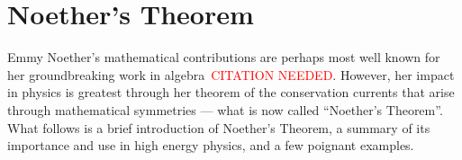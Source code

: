 \chapter{Noether's Theorem}\label{appendix:Noethers_theorem}

Emmy Noether's mathematical contributions are perhaps most well known for her groundbreaking work in algebra~\textcolor{red}{CITATION NEEDED}.
However, her impact in physics is greatest through her theorem of the conservation currents that arise through mathematical symmetries --- what is now called ``Noether's Theorem''.
What follows is a brief introduction of Noether's Theorem, a summary of its importance and use in high energy physics, and a few poignant examples.
